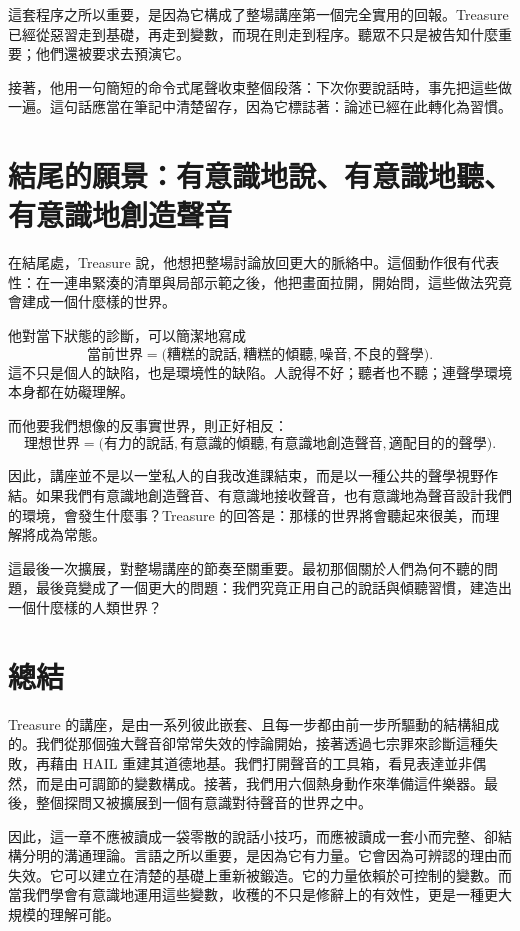 這套程序之所以重要，是因為它構成了整場講座第一個完全實用的回報。Treasure 已經從惡習走到基礎，再走到變數，而現在則走到程序。聽眾不只是被告知什麼重要；他們還被要求去預演它。

接著，他用一句簡短的命令式尾聲收束整個段落：下次你要說話時，事先把這些做一遍。這句話應當在筆記中清楚留存，因為它標誌著：論述已經在此轉化為習慣。

\section{結尾的願景：有意識地說、有意識地聽、有意識地創造聲音}

在結尾處，Treasure 說，他想把整場討論放回更大的脈絡中。這個動作很有代表性：在一連串緊湊的清單與局部示範之後，他把畫面拉開，開始問，這些做法究竟會建成一個什麼樣的世界。

他對當下狀態的診斷，可以簡潔地寫成
\begin{equation}
\text{當前世界}
=
\bigl(
\text{糟糕的說話},
\text{糟糕的傾聽},
\text{噪音},
\text{不良的聲學}
\bigr).
\end{equation}
這不只是個人的缺陷，也是環境性的缺陷。人說得不好；聽者也不聽；連聲學環境本身都在妨礙理解。

而他要我們想像的反事實世界，則正好相反：
\begin{equation}
\text{理想世界}
=
\bigl(
\text{有力的說話},
\text{有意識的傾聽},
\text{有意識地創造聲音},
\text{適配目的的聲學}
\bigr).
\end{equation}

因此，講座並不是以一堂私人的自我改進課結束，而是以一種公共的聲學視野作結。如果我們有意識地創造聲音、有意識地接收聲音，也有意識地為聲音設計我們的環境，會發生什麼事？Treasure 的回答是：那樣的世界將會聽起來很美，而理解將成為常態。

這最後一次擴展，對整場講座的節奏至關重要。最初那個關於人們為何不聽的問題，最後竟變成了一個更大的問題：我們究竟正用自己的說話與傾聽習慣，建造出一個什麼樣的人類世界？

\section{總結}

Treasure 的講座，是由一系列彼此嵌套、且每一步都由前一步所驅動的結構組成的。我們從那個強大聲音卻常常失效的悖論開始，接著透過七宗罪來診斷這種失敗，再藉由 HAIL 重建其道德地基。我們打開聲音的工具箱，看見表達並非偶然，而是由可調節的變數構成。接著，我們用六個熱身動作來準備這件樂器。最後，整個探問又被擴展到一個有意識對待聲音的世界之中。

因此，這一章不應被讀成一袋零散的說話小技巧，而應被讀成一套小而完整、卻結構分明的溝通理論。言語之所以重要，是因為它有力量。它會因為可辨認的理由而失效。它可以建立在清楚的基礎上重新被鍛造。它的力量依賴於可控制的變數。而當我們學會有意識地運用這些變數，收穫的不只是修辭上的有效性，更是一種更大規模的理解可能。